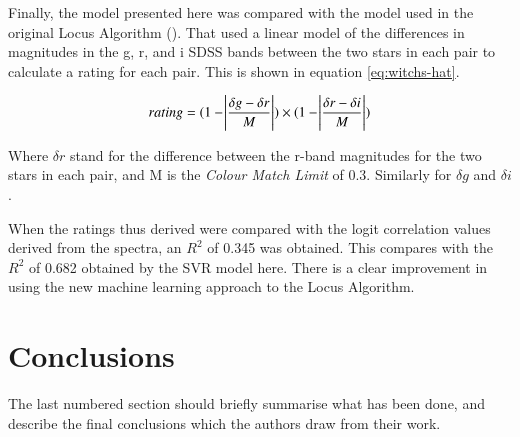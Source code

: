 \documentclass[preprint, 3p,
authoryear]{elsarticle} %
\begin{document}
Finally, the model presented here was compared with the model used in
the original Locus Algorithm (\citet{Creaner2021}). That used a linear
model of the differences in magnitudes in the g, r, and i SDSS bands
between the two stars in each pair to calculate a rating for each pair.
This is shown in equation \ref{eq:witchs-hat}.

\begin{equation}
rating =(1- \abs{\frac{\delta g - \delta r}{M}}) \times (1-\abs{\frac{\delta r - \delta i}{M}})
  \label{eq:witchs-hat}
\end{equation}

Where \(\delta r\) stand for the difference between the r-band
magnitudes for the two stars in each pair, and M is the \emph{Colour
Match Limit} of 0.3. Similarly for \(\delta g\) and \(\delta i\).

When the ratings thus derived were compared with the logit correlation
values derived from the spectra, an \(R^2\) of 0.345 was obtained. This
compares with the \(R^2\) of 0.682 obtained by the SVR model here. There
is a clear improvement in using the new machine learning approach to the
Locus Algorithm.

\hypertarget{conclusions}{%
\section{Conclusions}\label{conclusions}}

The last numbered section should briefly summarise what has been done,
and describe the final conclusions which the authors draw from their
work.

\renewcommand\refname{References}

\end{document}
